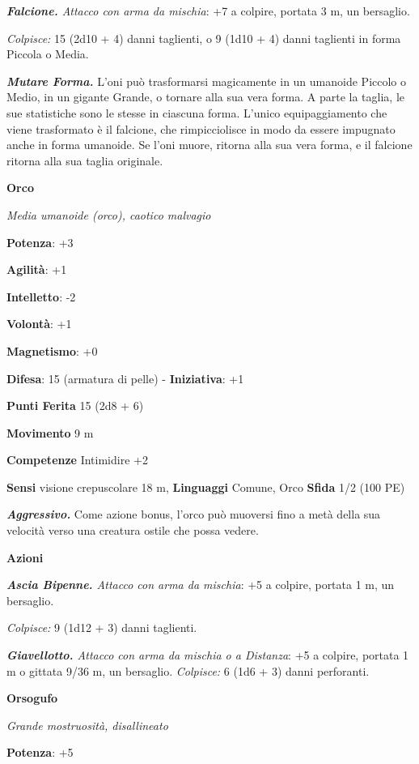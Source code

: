 \begin{multicols}{2}
\emph{\textbf{Falcione.} Attacco con arma da mischia}: +7 a colpire,
portata 3 m, un bersaglio.

\emph{Colpisce:} 15 (2d10 + 4) danni taglienti, o 9 (1d10 + 4) danni
taglienti in forma Piccola o Media.

\emph{\textbf{Mutare Forma.}} L'oni può trasformarsi magicamente in un
umanoide Piccolo o Medio, in un gigante Grande, o tornare alla sua vera
forma. A parte la taglia, le sue statistiche sono le stesse in ciascuna
forma. L'unico equipaggiamento che viene trasformato è il falcione, che
rimpicciolisce in modo da essere impugnato anche in forma umanoide. Se
l'oni muore, ritorna alla sua vera forma, e il falcione ritorna alla sua
taglia originale.

\textbf{Orco}

\emph{Media umanoide (orco), caotico malvagio}

\textbf{Potenza}: +3

\textbf{Agilità}: +1

\textbf{Intelletto}: -2

\textbf{Volontà}: +1

\textbf{Magnetismo}: +0

\textbf{Difesa}: 15 (armatura di pelle) - \textbf{Iniziativa}: +1

\textbf{Punti Ferita} 15 (2d8 + 6)

\textbf{Movimento} 9 m

\textbf{Competenze} Intimidire +2

\textbf{Sensi} visione crepuscolare 18 m, 
\textbf{Linguaggi} Comune, Orco \textbf{Sfida} 1/2 (100 PE)\smallskip

\emph{\textbf{Aggressivo.}} Come azione bonus, l'orco può muoversi fino
a metà della sua velocità verso una creatura ostile che possa vedere.

\smallskip\textbf{Azioni}

\emph{\textbf{Ascia Bipenne.} Attacco con arma da mischia}: +5 a
colpire, portata 1 m, un bersaglio.

\emph{Colpisce:} 9 (1d12 + 3) danni taglienti.

\emph{\textbf{Giavellotto.} Attacco con arma da mischia o a Distanza}:
+5 a colpire, portata 1 m o gittata 9/36 m, un bersaglio.
\emph{Colpisce:} 6 (1d6 + 3) danni perforanti.

\textbf{Orsogufo}

\emph{Grande mostruosità, disallineato}

\textbf{Potenza}: +5


\end{multicols}

